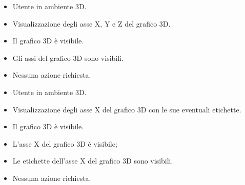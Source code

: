 \UCdsc
    { %
        \begin{itemize}
            \item Utente in ambiente 3D.
        \end{itemize}
    }
    { %
        \begin{itemize}
            \item Visualizzazione degli asse X, Y e Z del grafico 3D.
        \end{itemize}
    }
    { %
        \begin{itemize}
            \item Il grafico 3D è visibile.
        \end{itemize}
    }
    { %
        \begin{itemize}
            \item Gli assi del grafico 3D sono visibili.
        \end{itemize}
    }
    { %
        \begin{itemize}
            \item Nessuna azione richiesta.
        \end{itemize}
    }

\UCdsc
    { %
        \begin{itemize}
            \item Utente in ambiente 3D.
        \end{itemize}
    }
    { %
        \begin{itemize}
            \item Visualizzazione degli asse X del grafico 3D con le sue eventuali etichette.
        \end{itemize}
    }
    { %
        \begin{itemize}
            \item Il grafico 3D è visibile.
        \end{itemize}
    }
    { %
        \begin{itemize}
            \item L'asse X del grafico 3D è visibile;
            \item Le etichette dell'asse X del grafico 3D sono visibili.
        \end{itemize}
    }
    { %
        \begin{itemize}
            \item Nessuna azione richiesta.
        \end{itemize}
    }

